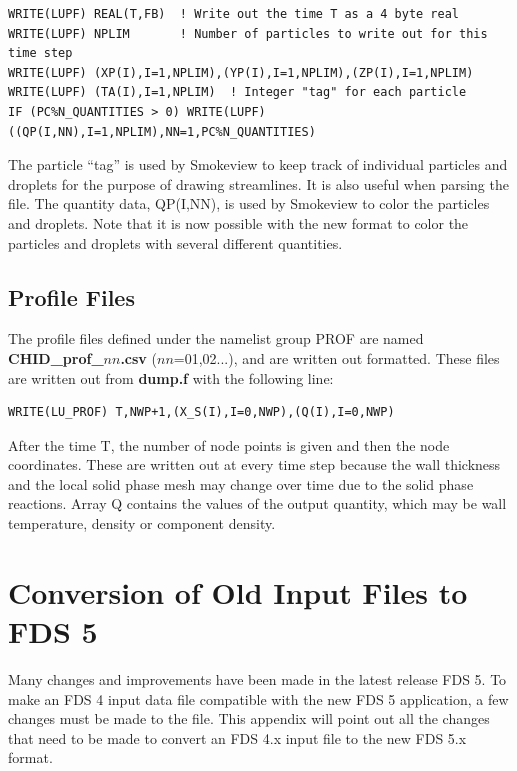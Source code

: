 \documentclass[11pt]{book}
\begin{document}
\footnotesize
\begin{verbatim}
WRITE(LUPF) REAL(T,FB)  ! Write out the time T as a 4 byte real
WRITE(LUPF) NPLIM       ! Number of particles to write out for this time step
WRITE(LUPF) (XP(I),I=1,NPLIM),(YP(I),I=1,NPLIM),(ZP(I),I=1,NPLIM)
WRITE(LUPF) (TA(I),I=1,NPLIM)  ! Integer "tag" for each particle
IF (PC%N_QUANTITIES > 0) WRITE(LUPF) ((QP(I,NN),I=1,NPLIM),NN=1,PC%N_QUANTITIES)
\end{verbatim}
\normalsize
The particle ``tag'' is used by Smokeview to keep track of individual particles and droplets for the purpose of drawing
streamlines. It is also useful when parsing the file. The quantity data, {\ct QP(I,NN)}, is used by Smokeview to color
the particles and droplets. Note that it is now possible with the new format to color the particles and droplets with
several different quantities.

\section{Profile Files}%
\label{out:PROF}

The profile files defined under the namelist group {\ct PROF} are
named {\bf CHID\_prof\_$nn$.csv} ($nn$=01,02...),
and are written out formatted. These files are written out from {\bf
dump.f} with the following line:

\footnotesize
\begin{verbatim}
WRITE(LU_PROF) T,NWP+1,(X_S(I),I=0,NWP),(Q(I),I=0,NWP)
\end{verbatim}
\normalsize
After the time {\ct T}, the number of node points is given and then
the node coordinates. These are written out at every time step because
the wall thickness and the local solid phase mesh may change over time
due to the solid phase reactions. Array {\ct Q} contains the values of
the output quantity, which may be wall temperature, density or
component density.

\chapter{Conversion of Old Input Files to FDS 5}

Many changes and improvements have been made in the latest release FDS 5.
To make an FDS 4 input data file compatible with the new FDS 5 application,
a few changes must be made to the file.
This appendix will point out all the changes that need to be made to convert
an FDS 4.x input file to the new FDS 5.x format.
\end{document}

